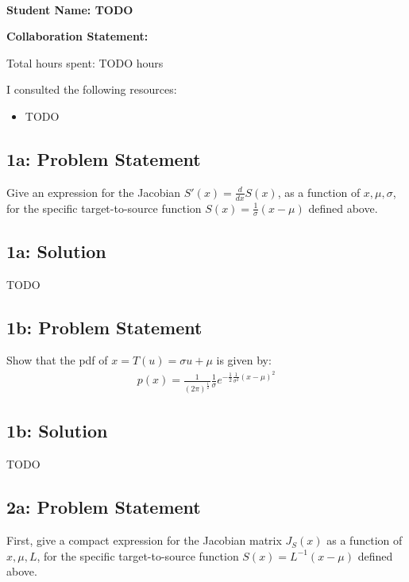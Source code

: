 \documentclass[10pt]{article}
\newcommand{\officialdirections}[1]{{\color{blue} #1}}
\begin{document}
~~\\ %
\Large{\bf Student Name: TODO}

\Large{\bf Collaboration Statement:}

Total hours spent: TODO hours

I consulted the following resources:
\begin{itemize}
\item TODO
\end{itemize}

\tableofcontents

\newpage
\officialdirections{
\subsection*{1a: Problem Statement}
Give an expression for the Jacobian $S'(x) = \frac{d}{dx} S(x)$, as a function of $x, \mu, \sigma$, for the specific target-to-source function $S(x) = \frac{1}{\sigma}(x - \mu)$ defined above.
}

\subsection{1a: Solution}

TODO

\newpage
\officialdirections{
\subsection*{1b: Problem Statement}
Show that the pdf of $x = T(u) = \sigma u + \mu$ is given by:
\begin{align}
p(x) = \frac{1}{(2\pi)^{\frac{1}{2}}} \frac{1}{\sigma} e^{-\frac{1}{2} \frac{1}{\sigma^2} (x-\mu)^2}
\end{align}
}


\subsection{1b: Solution}

TODO



\newpage
\officialdirections{
\subsection*{2a: Problem Statement}
 First, give a compact expression for the Jacobian matrix $J_S(x)$ as a function of $x, \mu, L$, for the specific target-to-source function $S(x) = L^{-1} (x - \mu)$ defined above.
}
\end{document}
